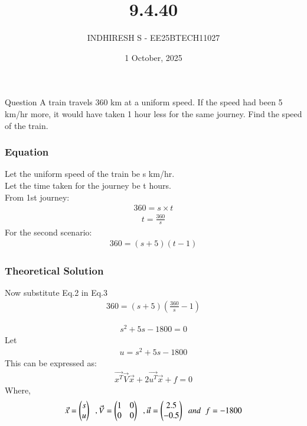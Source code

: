\documentclass{beamer}
\title %
    {9.4.40}
\date{1 October, 2025}
\author %
    {INDHIRESH S - EE25BTECH11027}
\begin{document}
    
    \frame{\titlepage}
    
    \begin{frame}{Question}
    A train travels 360 km at a uniform speed. If the speed had been 5 km/hr more, it would have taken 1 hour less for the same journey. Find the speed of the train.
    \end{frame}
    
    \begin{frame}[allowframebreaks] 
    \frametitle{Equation}
        \centering
        \label{tab:parameters}
   Let the uniform speed of the train be s km/hr.\\
Let the time taken for the journey be t hours.\\
From 1st journey:
\begin{align}
   360=s\times t
\end{align}
\begin{align}
  t=\frac{360}{s}
\end{align}
For the second scenario:
\begin{align}
 360=(s+5)(t-1)
\end{align}
    \end{frame}
    
    \begin{frame}
    \frametitle{Theoretical Solution}
    Now substitute Eq.2 in Eq.3
\begin{align}
  360=(s+5)(\frac{360}{s}-1)
\end{align}

\begin{align}
  s^2+5s-1800=0
\end{align}
Let
\begin{align}
    u= s^2+5s-1800
\end{align}
This can be expressed as:
\begin{align}
  \Vec{x^T}\Vec{V}\Vec{x} + 2\Vec{u^T}\Vec{x} + f = 0
\end{align}
Where,
\begin{align}
    \Vec{x}=\begin{pmatrix}s\\u\end{pmatrix}\;\; ,\Vec{V}=\begin{pmatrix}1&0\\0&0\end{pmatrix}\;\;,\Vec{u}=\begin{pmatrix}2.5\\-0.5\end{pmatrix}\;\;and\;\;f=-1800
\end{align}

    \end{frame}
    
\end{document}

